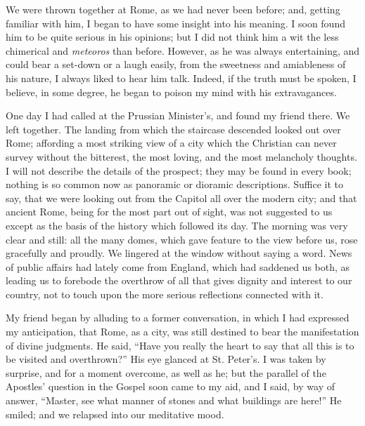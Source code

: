 We were thrown together at Rome, as we had never
been before; and, getting familiar with him, I began to have some
insight into his meaning. I soon found him to be quite serious in his
opinions; but I did not think him a wit the less chimerical and \emph{meteoros}
than before. However, as he was always entertaining, and could bear a
set-down or a laugh easily, from the sweetness and amiableness of his
nature, I always liked to hear him talk. Indeed, if the truth must be
spoken, I believe, in some degree, he began to poison my mind with his
extravagances.

One day I had called at the Prussian Minister's,
and found my friend there. We left together. The landing from which
the staircase descended looked out over Rome; affording a most
striking view of a city which the Christian can never survey without
the bitterest, the most loving, and the most melancholy thoughts.
I will not describe the details of the prospect; they may be found in
every book; nothing is so common now as panoramic or dioramic
descriptions. Suffice it to say, that we were looking out from the
Capitol all over the modern city; and that ancient Rome, being for the
most part out of sight, was not suggested to us except as the basis of
the history which followed its day. The morning was very clear and
still: all the many domes, which gave feature to the view before us,
rose gracefully and proudly. We lingered at the window without saying
a word. News of public affairs had lately come from England, which had
saddened us both, as leading us to forebode the overthrow of all that
gives dignity and interest to our country, not to touch upon the more
serious reflections connected with it.

My friend began by alluding to a former
conversation, in which I had expressed my anticipation, that Rome, as
a city, was still destined to bear the manifestation of divine
judgments. He said, ``Have you really the heart to say that all this is
to be visited and overthrown?'' His eye glanced at St. Peter's. I was
taken by surprise, and for a moment overcome, as well as he; but the
parallel of the Apostles' question in the Gospel soon came to my aid,
and I said, by way of answer, ``Master, see what manner of stones and
what buildings are here!'' He smiled; and we relapsed into our
meditative mood.

